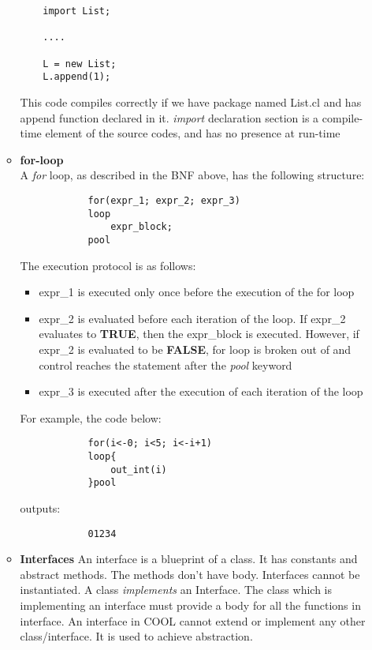 \documentclass[11pt]{article}
\begin{document}
\begin{enumerate}
\begin{itemize}
    \begin{verbatim}
    import List;
    
    ....
    
    L = new List;
    L.append(1);
\end{verbatim}
This code compiles correctly if we have package named List.cl and has append function declared in it. \textit{import} declaration section is a compile-time element of the source codes, and has no presence at run-time
        
    
        \item \textbf{for-loop}\\
        A \textit{for} loop, as described in the BNF above, has the following structure: 
        \begin{verbatim}
            for(expr_1; expr_2; expr_3)
            loop
                expr_block;
            pool
        \end{verbatim}
        The execution protocol is as follows:\\
        \begin{itemize}
            \item {expr\_1 is executed only once before the execution of the for loop}
            \item {expr\_2 is evaluated before each iteration of the loop. If expr\_2 evaluates to \textbf{TRUE}, then the expr\_block is executed. However, if expr\_2 is evaluated to be \textbf{FALSE}, for loop is broken out of and control reaches the statement after the \textit{pool} keyword}
            \item{expr\_3 is executed after the execution of each iteration of the loop}
        \end{itemize}
        
        For example, the code below:
        \begin{verbatim}
            for(i<-0; i<5; i<-i+1)
            loop{
                out_int(i)
            }pool
        \end{verbatim}
        outputs:
        \begin{verbatim}
            01234
        \end{verbatim}
        

        
        \item \textbf{Interfaces} An interface is a blueprint of a class. It has constants and abstract methods. The methods don't have body. Interfaces cannot be instantiated. A class \textit{implements} an Interface. The class which is implementing an interface must provide a body for all the functions in interface. An interface in COOL cannot extend or implement any other class/interface. It is used to achieve abstraction.
        

\end{itemize}
\end{enumerate}
\end{document}
